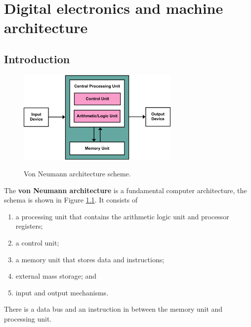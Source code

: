 \chapter{Digital electronics and machine architecture}

\section{Introduction}

\begin{figure}
    \centering
    \includegraphics[width = 0.7\textwidth]{images/von_neumann.png}
    \label{fig:von_neumann}
    \caption{Von Neumann architecture scheme.}
\end{figure}

\begin{definition}
    \label{def:von_neumann}
    The \textbf{von Neumann architecture} is a fundamental computer architecture, the schema is shown in Figure \ref{fig:von_neumann}. It consists of
    \begin{enumerate}
        \item a processing unit that contains the arithmetic logic unit and processor registers;
        \item a control unit;
        \item a memory unit that stores data and instructions;
        \item external mass storage; and
        \item input and output mechanisms. 
    \end{enumerate}
    There is a data bus and an instruction in between the memory unit and processing unit.
\end{definition}

